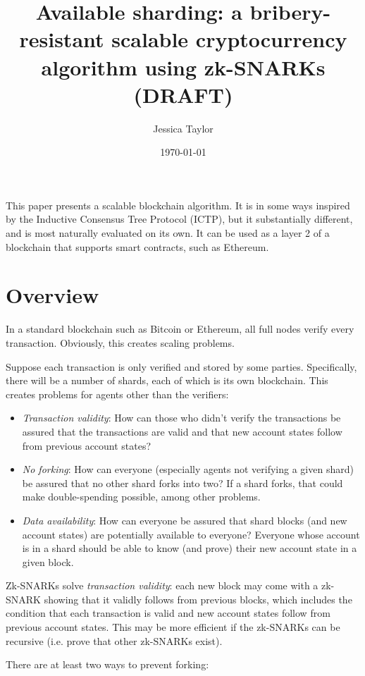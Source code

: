 \documentclass{article}
\title{Available sharding: a bribery-resistant scalable cryptocurrency algorithm using zk-SNARKs (DRAFT)}
\date{\today}
\author{Jessica Taylor}
\begin{document}
\maketitle

This paper presents a scalable blockchain algorithm.  It is in some ways inspired by the Inductive Consensus Tree Protocol (ICTP), but it substantially different, and is most naturally evaluated on its own.  It can be used as a layer 2 of a blockchain that supports smart contracts, such as Ethereum.

\section{Overview}

In a standard blockchain such as Bitcoin or Ethereum, all full nodes verify every transaction.  Obviously, this creates scaling problems.

Suppose each transaction is only verified and stored by some parties.  Specifically, there will be a number of shards, each of which is its own blockchain.  This creates problems for agents other than the verifiers:

\begin{itemize}
  \item \emph{Transaction validity}: How can those who didn't verify the transactions be assured that the transactions are valid and that new account states follow from previous account states?
  \item \emph{No forking}: How can everyone (especially agents not verifying a given shard) be assured that no other shard forks into two?  If a shard forks, that could make double-spending possible, among other problems.
  \item \emph{Data availability}: How can everyone be assured that shard blocks (and new account states) are potentially available to everyone?  Everyone whose account is in a shard should be able to know (and prove) their new account state in a given block.
\end{itemize}

Zk-SNARKs solve \emph{transaction validity}: each new block may come with a zk-SNARK showing that it validly follows from previous blocks, which includes the condition that each transaction is valid and new account states follow from previous account states.  This may be more efficient if the zk-SNARKs can be recursive (i.e. prove that other zk-SNARKs exist).

There are at least two ways to prevent forking:
\end{document}
